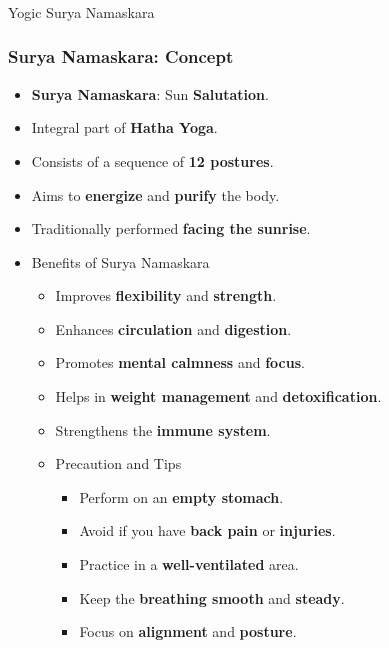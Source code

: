\begin{frame}[fragile]\frametitle{}
\begin{center}
{\Large Yogic Surya Namaskara}
\end{center}
\end{frame}

\begin{frame}[fragile]\frametitle{Surya Namaskara: Concept}
      \begin{itemize}
        \item \textbf{Surya Namaskara}: Sun \textbf{Salutation}.
        \item Integral part of \textbf{Hatha Yoga}.
        \item Consists of a sequence of \textbf{12 postures}.
        \item Aims to \textbf{energize} and \textbf{purify} the body.
        \item Traditionally performed \textbf{facing the sunrise}.
		\item Benefits of Surya Namaskara
		      \begin{itemize}
			\item Improves \textbf{flexibility} and \textbf{strength}.
			\item Enhances \textbf{circulation} and \textbf{digestion}.
			\item Promotes \textbf{mental calmness} and \textbf{focus}.
			\item Helps in \textbf{weight management} and \textbf{detoxification}.
			\item Strengthens the \textbf{immune system}.
		\item Precaution and Tips
		  \begin{itemize}
			\item Perform on an \textbf{empty stomach}.
			\item Avoid if you have \textbf{back pain} or \textbf{injuries}.
			\item Practice in a \textbf{well-ventilated} area.
			\item Keep the \textbf{breathing smooth} and \textbf{steady}.
			\item Focus on \textbf{alignment} and \textbf{posture}.
		  \end{itemize}		
		  \end{itemize}
      \end{itemize}

\end{frame}

